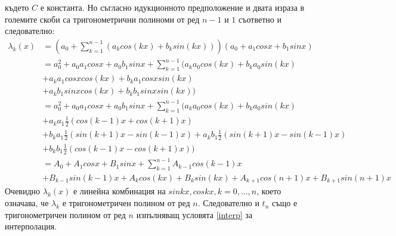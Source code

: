 \documentclass[12pt]{article}
\numberwithin{equation}{subsection}
\numberwithin{theorem}{subsection}
\numberwithin{definition}{subsection}
\numberwithin{corollary}{subsection}
\begin{document}
  където $C$ е константа. Но съгласно идукционното предположение и двата израза в големите скоби са тригонометрични полиноми от ред $n-1$ и $1$ съответно и следователно:
  \begin{align*}
    \lambda_k(x)&= \left(a_0+\sum_{k=1}^{n-1}(a_kcos(kx)+b_ksin(kx))\right)(a_0+a_1cosx+b_1sinx)\\
    &=a_0^2+a_0a_1cosx+a_0b_1sinx + \sum_{k=1}^{n-1}\bigl(a_ka_0cos(kx)+b_ka_0sin(kx)\\
    &+a_ka_1cosxcos(kx)+b_ka_1cosxsin(kx)\\
    &+a_kb_1sinxcos(kx)+b_kb_1sinxsin(kx)\bigr)\\
    &=a_0^2+a_0a_1cosx+a_0b_1sinx + \sum_{k=1}^{n-1}\bigl(a_ka_0cos(kx)+b_ka_0sin(kx)\\
    &+a_ka_1\frac{1}{2}(cos(k-1)x+cos(k+1)x)\\
    &+b_ka_1\frac{1}{2}(sin(k+1)x-sin(k-1)x)+a_kb_1\frac{1}{2}(sin(k+1)x-sin(k-1)x)\\
    &+b_kb_1\frac{1}{2}(cos(k-1)x-cos(k+1)x))\\
    &=A_0+A_1cosx+B_1sinx+\sum_{k=1}^{n-1}A_{k-1}cos(k-1)x\\
    &+B_{k-1}sin(k-1)x+A_kcos(kx)+B_ksin(kx)+A_{k+1}cos(n+1)x+B_{k+1}sin(n+1)x
  \end{align*}
  Очевидно $\lambda_k(x)$ е линейна комбинация на $sinkx, coskx, k=0,\ldots,n$, което означава, че $\lambda_k$ е тригонометричен полином от ред $n$. Следователно и $t_n$ също е тригонометричен полином от ред $n$ изпълняващ условята \ref{interp} за интерполация.
\end{document}
